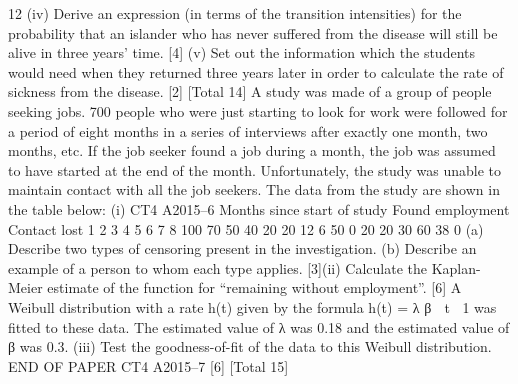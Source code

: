 \documentclass[a4paper,12pt]{article}
\begin{document}
\begin{enumerate}

12
(iv) Derive an expression (in terms of the transition intensities) for the probability
that an islander who has never suffered from the disease will still be alive in
three years’ time.
[4]
(v) Set out the information which the students would need when they returned
three years later in order to calculate the rate of sickness from the disease. [2]
[Total 14]
A study was made of a group of people seeking jobs. 700 people who were just
starting to look for work were followed for a period of eight months in a series of
interviews after exactly one month, two months, etc. If the job seeker found a job
during a month, the job was assumed to have started at the end of the month.
Unfortunately, the study was unable to maintain contact with all the job seekers.
The data from the study are shown in the table below:
(i)
CT4 A2015–6
Months since
start of study Found employment Contact lost
1
2
3
4
5
6
7
8 100
70
50
40
20
20
12
6 50
0
20
20
30
60
38
0
(a) Describe two types of censoring present in the investigation.
(b) Describe an example of a person to whom each type applies.
[3](ii)
Calculate the Kaplan-Meier estimate of the function for “remaining without
employment”.
[6]
A Weibull distribution with a rate h(t) given by the formula h(t) = λ β  t 1 was fitted
to these data. The estimated value of λ was 0.18 and the estimated value of β was 0.3.
(iii)
Test the goodness-of-fit of the data to this Weibull distribution.
END OF PAPER
CT4 A2015–7
[6]
[Total 15]



\end{enumerate}
\end{document}
